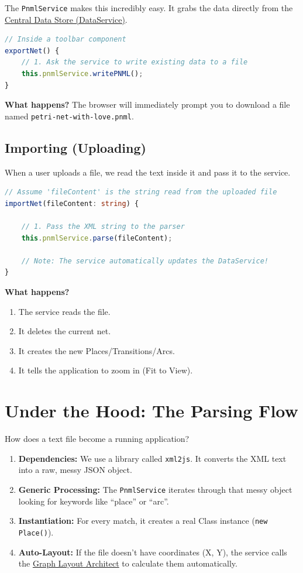 \documentclass[a4paper,11pt,oneside]{report}
\begin{document}
The \texttt{PnmlService} makes this incredibly easy. It grabs the data directly from the \hyperref[chap:dataservice]{Central Data Store (DataService)}.

\begin{lstlisting}[language=TypeScript]
// Inside a toolbar component
exportNet() {
    // 1. Ask the service to write existing data to a file
    this.pnmlService.writePNML();
}
\end{lstlisting}

\textbf{What happens?} The browser will immediately prompt you to download a file named \texttt{petri-net-with-love.pnml}.

\subsection{Importing (Uploading)}

When a user uploads a file, we read the text inside it and pass it to the service.

\begin{lstlisting}[language=TypeScript]
// Assume 'fileContent' is the string read from the uploaded file
importNet(fileContent: string) {
    
    // 1. Pass the XML string to the parser
    this.pnmlService.parse(fileContent);

    // Note: The service automatically updates the DataService!
}
\end{lstlisting}

\textbf{What happens?}
\begin{enumerate}
    \item The service reads the file.
    \item It deletes the current net.
    \item It creates the new Places/Transitions/Arcs.
    \item It tells the application to zoom in (Fit to View).
\end{enumerate}

\section{Under the Hood: The Parsing Flow}

How does a text file become a running application?

\begin{enumerate}
    \item \textbf{Dependencies:} We use a library called \texttt{xml2js}. It converts the XML text into a raw, messy JSON object.
    \item \textbf{Generic Processing:} The \texttt{PnmlService} iterates through that messy object looking for keywords like ``place'' or ``arc''.
    \item \textbf{Instantiation:} For every match, it creates a real Class instance (\texttt{new Place()}).
    \item \textbf{Auto-Layout:} If the file doesn't have coordinates (X, Y), the service calls the \hyperref[chap:layout]{Graph Layout Architect} to calculate them automatically.
\end{enumerate}
\end{document}

